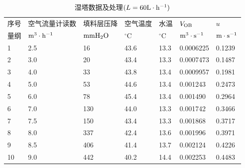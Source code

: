 \documentclass[UTF8,AutoFakeBold,a4paper]{article}
\begin{document}
\begin{table}[h]
\caption{湿塔数据及处理$(L = 60 \rm{L}\cdot\rm{h}^{-1})$}
		\centering
		\begin{tabular}{p{1.5cm}<{\centering} p{3cm}<{\centering} p{3cm}<{\centering} p{2cm}<{\centering} p{2cm}<{\centering} p{3cm}<{\centering} p{3cm}<{\centering}}
		\toprule
		
   序号 & 空气流量计读数 & 填料层压降 & 空气温度&水温 & $V_{\rm{OB}}$ & $u$ \\ 

  量纲&$\rm{m}^{3}\cdot\rm{h}^{-1}$&$\rm{mm}\ce{H2O}$&$^\circ$C&$^\circ$C&$\rm{m}^{3}\cdot\rm{s}^{-1}$&$\rm{m}\cdot\rm{s}^{-1}$\\
 \midrule
             1 & 2.5 & 16 & 43.6 & 13.3 & 0.0006225 & 0.1239 \\ 
        2 & 3.0 & 20 & 43.4 & 13.3 & 0.0007473 & 0.1487 \\ 
        3 & 4.0 & 33 & 43.8 & 13.4 & 0.0009957 & 0.1981 \\ 
        4 & 5.0 & 53 & 44.6 & 13.4 & 0.001243 & 0.2473 \\ 
        5 & 6.0 & 78 & 45.4 & 13.4 & 0.001490 & 0.2964 \\ 
        6 & 7.0 & 130 & 44.0 & 13.3 & 0.001742 & 0.3466 \\ 
        7 & 7.5 & 150 & 43.4 & 13.3 & 0.001868 & 0.3717 \\ 
        8 & 8.0 & 337 & 42.4 & 13.6 & 0.001996 & 0.3971 \\ 
        9 & 8.5 & 406 & 41.4 & 13.7 & 0.002124 & 0.4226 \\ 
        10 & 9.0 & 442 & 40.2 & 14.4 & 0.002253 & 0.4483 \\ 		
        \bottomrule
		\end{tabular}	
		\label{ta1}
		
\end{table}
\newpage
\end{document}

